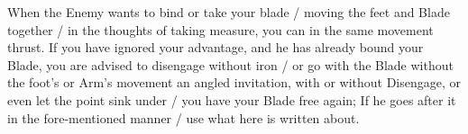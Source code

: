 

When the Enemy wants to bind or take your blade / moving the feet and
Blade together / in the thoughts of taking measure, you can in the
same movement thrust. If you have ignored your advantage, and he has
already bound your Blade, you are advised to disengage without iron /
or go with the Blade without the foot's or Arm's movement an angled
invitation, with or without Disengage, or even let the point sink
under / you have your Blade free again; If he goes after it in the
fore-mentioned manner / use what here is written about.